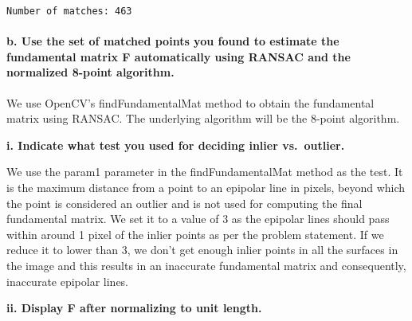 \documentclass{article}
\begin{document}
    \begin{Verbatim}[commandchars=\\\{\}]
Number of matches: 463
    \end{Verbatim}

    \paragraph{b. Use the set of matched points you found to estimate the
fundamental matrix F automatically using RANSAC and the normalized
8-point
algorithm.}\label{b.-use-the-set-of-matched-points-you-found-to-estimate-the-fundamental-matrix-f-automatically-using-ransac-and-the-normalized-8-point-algorithm.}

We use OpenCV's findFundamentalMat method to obtain the fundamental
matrix using RANSAC. The underlying algorithm will be the 8-point
algorithm.

\textbf{i. Indicate what test you used for deciding inlier vs.~outlier.}

We use the param1 parameter in the findFundamentalMat method as the
test. It is the maximum distance from a point to an epipolar line in
pixels, beyond which the point is considered an outlier and is not used
for computing the final fundamental matrix. We set it to a value of 3 as
the epipolar lines should pass within around 1 pixel of the inlier
points as per the problem statement. If we reduce it to lower than 3, we
don't get enough inlier points in all the surfaces in the image and this
results in an inaccurate fundamental matrix and consequently, inaccurate
epipolar lines.

\textbf{ii. Display F after normalizing to unit length.}
\end{document}

